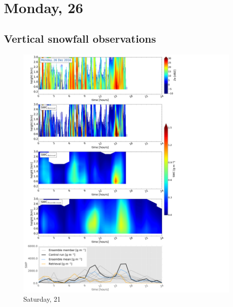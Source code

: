 \section{Monday, \SI{26}{\dec}}


\subsection{Vertical snowfall observations}
\begin{figure}[h]
	\includegraphics[trim={0.5cm 0.5cm 17.5cm .5cm},clip,width=\textwidth]{./fig_SWC/20161226}
	\caption{Saturday, \SI{21}{\dec}}\label{fig:SWC26}
\end{figure}
%
% 

